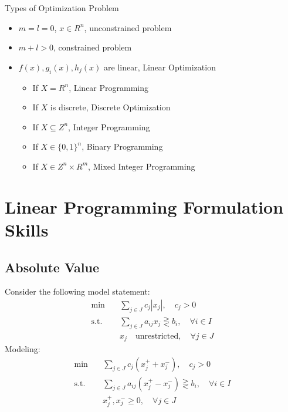 
				Types of Optimization Problem
				\begin{itemize}
					\item $m = l = 0$, $x \in R^n$, unconstrained problem
					\item $m + l > 0$, constrained problem
					\item $f(x), g_i(x), h_j(x)$ are linear, Linear Optimization
					\begin{itemize}
						\item If $X=R^n$, Linear Programming
						\item If $X$ is discrete,  Discrete Optimization
						\item If $X \subseteq Z^n$, Integer Programming
						\item If $X\in \{0,1\}^n$, Binary Programming
						\item If $X\in Z^n \times R^m$, Mixed Integer Programming
					\end{itemize}
				\end{itemize}

			\section{Linear Programming Formulation Skills}
				\subsection{Absolute Value}
					Consider the following model statement:
					\begin{align}
						\min \quad & \sum_{j\in J}c_j|x_j|, \quad c_j > 0 \\
						\text{s.t.} \quad & \sum_{j\in J}a_{ij}x_j \gtreqless b_i, \quad \forall i\in I \\
						                  & x_j \quad \text{unrestricted}, \quad \forall j\in J 
					\end{align}
					Modeling:
					\begin{align}
						\min \quad & \sum_{j\in J}c_j(x_j^+ + x_j^-), \quad c_j > 0 \\
						\text{s.t.} \quad & \sum_{j\in J}a_{ij}(x_j^+ - x_j^-) \gtreqless b_i, \quad \forall i\in I \\
						                  & x_j^+, x_j^- \ge 0, \quad \forall j\in J 
					\end{align}


